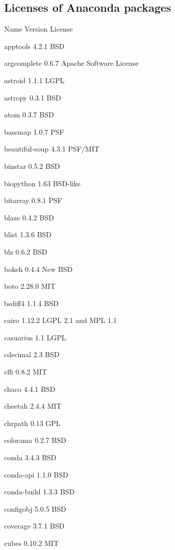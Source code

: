 \documentclass[letterpaper,10pt,openany,oneside]{sphinxmanual}
\begin{document}
\subsection{Licenses of Anaconda packages}
\label{rst/licenses:licenses-of-anaconda-packages}
\begin{DUlineblock}{0em}
\item[] Name  Version         License
\item[] apptools      4.2.1   BSD
\item[] argcomplete   0.6.7   Apache Software License
\item[] astroid       1.1.1   LGPL
\item[] astropy       0.3.1   BSD
\item[] atom  0.3.7   BSD
\item[] basemap       1.0.7   PSF
\item[] beautiful-soup        4.3.1   PSF/MIT
\item[] binstar       0.5.2   BSD
\item[] biopython     1.63    BSD-like
\item[] bitarray      0.8.1   PSF
\item[] blaze         0.4.2   BSD
\item[] blist         1.3.6   BSD
\item[] blz   0.6.2   BSD
\item[] bokeh         0.4.4   New BSD
\item[] boto  2.28.0  MIT
\item[] bsdiff4       1.1.4   BSD
\item[] cairo         1.12.2  LGPL 2.1 and MPL 1.1
\item[] casuarius     1.1     LGPL
\item[] cdecimal      2.3     BSD
\item[] cffi  0.8.2   MIT
\item[] chaco         4.4.1   BSD
\item[] cheetah       2.4.4   MIT
\item[] chrpath       0.13    GPL
\item[] colorama      0.2.7   BSD
\item[] conda         3.4.3   BSD
\item[] conda-api     1.1.0   BSD
\item[] conda-build   1.3.3   BSD
\item[] configobj     5.0.5   BSD
\item[] coverage      3.7.1   BSD
\item[] cubes         0.10.2  MIT

\end{DUlineblock}
\end{document}
